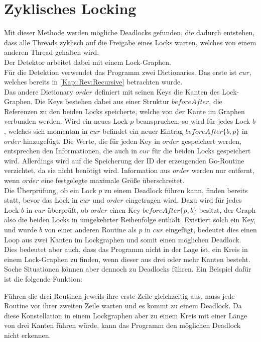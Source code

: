 \section{Zyklisches Locking}\label{Kap::Rev:Cyclic}
Mit dieser Methode werden mögliche Deadlocks gefunden, die dadurch entstehen,
dass alle Threads zyklisch auf die Freigabe eines Locks warten, welches von 
einem anderen Thread gehalten wird.\\ 
Der Detektor arbeitet dabei mit einem Lock-Graphen.\\
Für die Detektion verwendet das Programm zwei Dictionaries. Das erste ist $cur$, 
welches bereits in \ref{Kap::Rev:Recursive} betrachten wurde.\\
Das andere Dictionary $order$ definiert mit seinen Keys die Kanten des Lock-Graphen.
Die Keys bestehen dabei aus einer Struktur $beforeAfter$, die Referenzen zu den beiden
Locks speicherte, welche von der Kante im Graphen verbunden werden.
Wird ein neues Lock $p$ beanspruchen, so wird für 
jedes Lock $b$, welches sich momentan in $cur$ befindet ein  
neuer Eintrag $beforeAfter\{b, p\}$ in $order$ hinzugefügt. 
Die Werte, die für jeden Key in $order$ gespeichert werden, entsprechen 
den Informationen, die auch in $cur$ für die beiden Locks gespeichert wird. Allerdings 
wird auf die Speicherung der ID der erzeugenden Go-Routine verzichtet, da sie 
nicht benötigt wird.
Information aus $order$ werden nur entfernt, wenn $order$ eine festgelegte 
maximale Größe überschreitet.\\ 
Die Überprüfung, ob ein Lock $p$ zu einem Deadlock führen kann, finden bereits statt,
bevor das Lock in $cur$ und $order$ eingetragen wird. Dazu wird für jedes Lock
$b$ in $cur$ überprüft,
ob $order$ einen Key $beforeAfter\{p, b\}$ besitzt, der Graph also die beiden 
Locks in 
umgekehrter Reihenfolge enthält. Existiert solch ein Key, und wurde $b$ 
von einer anderen Routine als $p$ in $cur$ eingefügt, bedeutet dies einen 
Loop aus zwei Kanten im Lockgraphen und somit einen möglichen Deadlock.\\
Dies bedeutet aber auch, dass das Programm nicht in der Lage ist, ein Kreis 
in einem Lock-Graphen zu finden, wenn dieser aus drei oder mehr Kanten besteht.
Soche Situationen können aber dennoch zu Deadlocks führen. Ein Beispiel dafür 
ist die folgende Funktion:
\begin{figure}[H]
    
\end{figure}
Führen die drei Routinen jeweils ihre erste Zeile gleichzeitig aus, muss jede 
Routine vor ihrer zweiten Zeile warten und es kommt zu einem Deadlock. Da diese
Konstellation in einem Lockgraphen aber zu einem Kreis mit einer Länge von drei 
Kanten führen würde, kann das Programm den möglichen Deadlock nicht erkennen.\\

